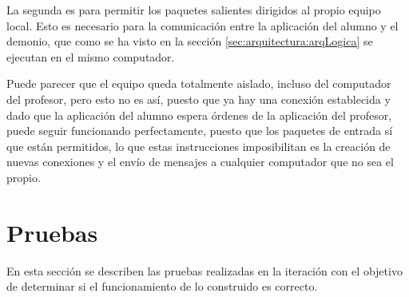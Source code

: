 La segunda es para permitir los paquetes salientes dirigidos al propio equipo local. Esto es necesario para la comunicación entre la aplicación del alumno y el demonio, que como se ha visto en la sección \ref{sec:arquitectura:arqLogica} se ejecutan en el mismo computador.
\newline

Puede parecer que el equipo queda totalmente aislado, incluso del computador del profesor, pero esto no es así, puesto que ya hay una conexión establecida y dado que la aplicación del alumno espera órdenes de la aplicación del profesor, puede seguir funcionando perfectamente, puesto que los paquetes de entrada sí que están permitidos, lo que estas instrucciones imposibilitan es la creación de nuevas conexiones y el envío de mensajes a cualquier computador que no sea el propio.


\section{Pruebas}
\label{sec:iteracion2:pruebas}


En esta sección se describen las pruebas realizadas en la iteración con el objetivo de determinar si el funcionamiento de lo construido es correcto.
\newline

